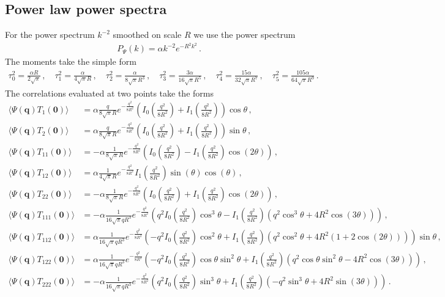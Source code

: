 \documentclass[a4paper, 11pt]{article}
\begin{document}
\subsection{Power law power spectra}
\noindent For the power spectrum $k^{-2}$ smoothed on scale $R$ we use the power spectrum
\begin{align}
P_{\Psi}(k) = \alpha k^{-2} e^{-R^2k^2}\,.
\end{align}
The moments take the simple form
{\scriptsize
\begin{align}
\tau_0^2=\frac{\alpha R}{2\sqrt{\pi}}\,,\quad
\tau_1^2=\frac{\alpha}{4 \sqrt{\pi}R}\,,\quad
\tau_2^2=\frac{\alpha}{8\sqrt{\pi} R^3}\,,\quad
\tau_3^2=\frac{3 \alpha}{16 \sqrt{\pi} R^5}\,,\quad
\tau_4^2=\frac{15 \alpha}{32 \sqrt{\pi}R^7}\,, \quad
\tau_5^2=\frac{105 \alpha}{64 \sqrt{\pi}R^9}\,.
\end{align}
}
The correlations evaluated at two points take the forms
{\scriptsize
\begin{align}
\langle \Psi(\bm{q}) T_1(\bm{0})\rangle &= \alpha \frac{q}{8\sqrt{\pi}R}e^{-\frac{q^2}{8R^2}}
\left(I_0\left(\frac{q^2}{8R^2}\right) + I_1\left(\frac{q^2}{8R^2}\right)\right)\cos\theta\,,\\
\langle \Psi(\bm{q}) T_2(\bm{0})\rangle &= \alpha \frac{q}{8\sqrt{\pi}R}e^{-\frac{q^2}{8R^2}}
\left(I_0\left(\frac{q^2}{8R^2}\right) + I_1\left(\frac{q^2}{8R^2}\right)\right)\sin\theta\,,\\
%
\langle \Psi(\bm{q}) T_{11}(\bm{0})\rangle &= -\alpha \frac{1}{8\sqrt{\pi}R}e^{-\frac{q^2}{8R^2}}
\left(I_0\left(\frac{q^2}{8R^2}\right) - I_1\left(\frac{q^2}{8R^2}\right)\cos(2\theta)\right)\,,\\
\langle \Psi(\bm{q}) T_{12}(\bm{0})\rangle &= \alpha \frac{1}{4\sqrt{\pi}R}e^{-\frac{q^2}{8R^2}}
 I_1\left(\frac{q^2}{8R^2}\right)\sin (\theta)\cos(\theta)\,,\\
\langle \Psi(\bm{q}) T_{22}(\bm{0})\rangle &= -\alpha \frac{1}{8\sqrt{\pi}R}e^{-\frac{q^2}{8R^2}}
\left(I_0\left(\frac{q^2}{8R^2}\right) + I_1\left(\frac{q^2}{8R^2}\right)\cos(2\theta)\right)\,,\\
%
\langle \Psi(\bm{q}) T_{111}(\bm{0})\rangle &= -\alpha \frac{1}{16\sqrt{\pi}qR^3}e^{-\frac{q^2}{8R^2}}
\left(q^2 I_0\left(\frac{q^2}{8R^2}\right) \cos^3\theta - I_1\left(\frac{q^2}{8R^2}\right)(q^2 \cos^3 \theta + 4 R^2 \cos (3\theta))\right)\,,\\
\langle \Psi(\bm{q}) T_{112}(\bm{0})\rangle &= \alpha \frac{1}{16\sqrt{\pi}qR^3}e^{-\frac{q^2}{8R^2}}
\left(-q^2  I_0\left(\frac{q^2}{8R^2}\right)\cos^2\theta +  I_1\left(\frac{q^2}{8R^2}\right)(q^2 \cos^2 \theta + 4R^2 (1+2\cos (2\theta)))\right)\sin\theta\,,\\
\langle \Psi(\bm{q}) T_{122}(\bm{0})\rangle &= \alpha \frac{1}{16\sqrt{\pi}qR^3}e^{-\frac{q^2}{8R^2}}
\left(-q^2  I_0\left(\frac{q^2}{8R^2}\right)\cos \theta \sin^2\theta +  I_1\left(\frac{q^2}{8R^2}\right)(q^2 \cos \theta \sin^2 \theta - 4R^2 \cos(3\theta))\right)\,,\\
\langle \Psi(\bm{q}) T_{222}(\bm{0})\rangle &= -\alpha \frac{1}{16\sqrt{\pi}qR^3}e^{-\frac{q^2}{8R^2}}
\left(q^2 I_0\left(\frac{q^2}{8R^2}\right) \sin^3\theta + I_1\left(\frac{q^2}{8R^2}\right)(-q^2 \sin^3 \theta + 4 R^2 \sin (3\theta))\right)\,.
\end{align}
}
\end{document}
